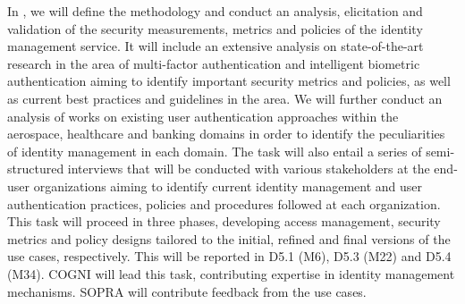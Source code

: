 \begin{Workpackage}{\thewpno}
\begin{WPDescription}
\end{WPDescription}

\begin{Task}

\TaskResults{%
\ref{del:auth1},
\ref{del:auth3},
\ref{del:auth4}
}
\TaskHeader{}

In \theTask, we will define the methodology and conduct an analysis, elicitation and validation of the security measurements, metrics and policies of the identity management service. It will include an extensive analysis on state-of-the-art research in the area of multi-factor authentication and intelligent biometric authentication aiming to identify important security metrics and policies, as well as current best practices and guidelines in the area. We will further conduct an analysis of works on existing user authentication approaches within the aerospace, healthcare and banking domains in order to identify the peculiarities of identity management in each domain. The task will also entail a series of semi-structured interviews that will be conducted with various stakeholders at the end-user organizations aiming to identify current identity management and user authentication practices, policies and procedures followed at each organization. This task will proceed in three phases, developing access management, security metrics and policy designs tailored to the initial, refined and final versions of the use cases, respectively. This
will be reported in D5.1 (M6), D5.3 (M22) and D5.4 (M34). COGNI will lead this task, contributing expertise in identity management mechanisms. SOPRA will contribute feedback from the use cases. 
\end{Task}

\begin{Task}

\TaskResults{%
\ref{del:auth2},
\ref{del:auth3},
\ref{del:auth4}
}
\TaskHeader{}


\end{Task}
\end{Workpackage}
